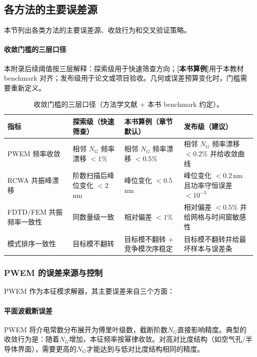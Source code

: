 \subsection{各方法的主要误差源}
\label{sec:numerical-error-per-method}
本节列出各类方法的主要误差源、收敛行为和交叉验证策略。

\paragraph{收敛门槛的三层口径}
本附录后续阈值按三层解释：探索级用于快速筛查方向；\textbf{[本书算例]}用于本教材 benchmark 对齐；发布级用于论文或项目验收。几何或误差预算变化时，门槛需要重新定义。

\begin{table}[htbp]
  \centering
  \footnotesize
  \caption{收敛门槛的三层口径（方法学文献 + 本书 benchmark 约定）。}
  \label{tab:method_threshold_tiers}
  \setlength{\tabcolsep}{4pt}
  \begin{tabularx}{\textwidth}{@{}p{3.0cm}p{3.1cm}p{3.3cm}Y@{}}
    \toprule
    指标 & 探索级（快速筛查） & 本书算例（章节默认） & 发布级（建议） \\
    \midrule
    PWEM 频率收敛 & 相邻 $N_G$ 频率漂移 $<1\%$ & 相邻 $N_G$ 频率漂移 $<0.5\%$ & 相邻 $N_G$ 频率漂移 $<0.2\%$ 并给收敛曲线 \\
    RCWA 共振峰漂移 & 阶数扫描后峰位变化 $<2\,$nm & 峰位变化 $<0.5\,$nm & 峰位变化 $<0.2\,$nm 且功率守恒误差 $<10^{-3}$ \\
    FDTD/FEM 共振频率一致性 & 同数量级一致 & 相对偏差 $<1\%$ & 相对偏差 $<0.5\%$ 并给网格与时间窗敏感性 \\
    模式排序一致性 & 目标模不翻转 & 目标模不翻转 + 竞争模次序稳定 & 目标模不翻转并给最坏样本与误差条 \\
    \bottomrule
  \end{tabularx}
\end{table}

\subsubsection{PWEM 的误差来源与控制}
PWEM 作为本征模求解器，其主要误差来自三个方面：

\paragraph{平面波截断误差}
PWEM 将介电常数分布展开为傅里叶级数，截断阶数$N_G$直接影响精度。典型的收敛行为是：随着$N_G$增加，本征频率按幂律收敛。对高对比度结构（如空气孔/半导体界面），需要更高的$N_G$才能达到与低对比度结构相同的精度。

